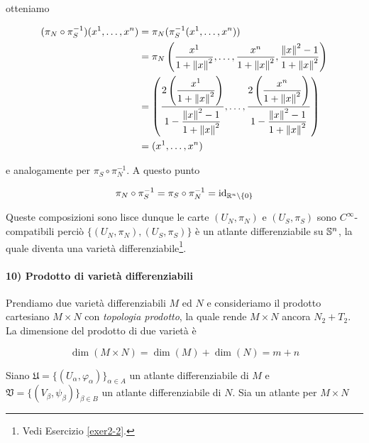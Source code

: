 otteniamo

\begin{align}
	\begin{split}
		(\pi_{N} \circ \pi_{S}^{-1}) (x^{1},\dots,x^{n}) &= \pi_{N} (\pi_{S}^{-1} (x^{1},\dots,x^{n})) \\
		&= \pi_{N} \left( \dfrac{x^{1}}{1+\norm{x}^{2}},\dots,\dfrac{x^{n}}{1+\norm{x}^{2}},\dfrac{\norm{x}^{2}-1}{1+\norm{x}^{2}} \right) \\
		&= \left( \dfrac{ 2 \left( \dfrac{x^{1}}{1 + \norm{x}^{2}} \right) }{ 1 - \dfrac{\norm{x}^{2} - 1}{1 + \norm{x}^{2}} }, \dots, \dfrac{ 2 \left( \dfrac{x^{n}}{1 + \norm{x}^{2}} \right) }{ 1 - \dfrac{\norm{x}^{2} - 1}{1 + \norm{x}^{2}} } \right) \\
		&= (x^{1},\dots,x^{n})
	\end{split}
\end{align}

e analogamente per $ \pi_{S} \circ \pi_{N}^{-1} $. A questo punto

\begin{equation}
	\pi_{N} \circ \pi_{S}^{-1} = \pi_{S} \circ \pi_{N}^{-1} %
	= \id_{\R^{n} \setminus \{0\}}
\end{equation}

Queste composizioni sono lisce dunque le carte $ (U_{N},\pi_{N}) $ e $ (U_{S},\pi_{S}) $ sono $ C^{\infty} $-compatibili perciò $ \{(U_{N},\pi_{N}),(U_{S},\pi_{S})\} $ è un atlante differenziabile su $ \S^{n} $, la quale diventa una varietà differenziabile\footnote{%
	Vedi Esercizio \ref{exer2-2}.%
}.

\paragraph{10) Prodotto di varietà differenziabili}

Prendiamo due varietà differenziabili $ M $ ed $ N $ e consideriamo il prodotto cartesiano $ M \times N $ con \textit{topologia prodotto}, la quale rende $ M \times N $ ancora $ N_{2}+T_{2} $. La dimensione del prodotto di due varietà è

\begin{equation}
	\dim (M \times N) = \dim(M) + \dim(N) = m + n
\end{equation}

Siano $ \mathfrak{U} = \{(U_{\alpha},\varphi_{\alpha})\}_{\alpha \in A} $ un atlante differenziabile di $ M $ e $ \mathfrak{V} = \{(V_{\beta},\psi_{\beta})\}_{\beta \in B} $ un atlante differenziabile di $ N $. Sia un atlante per $ M \times N $

